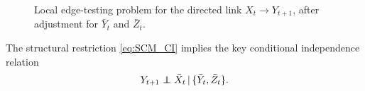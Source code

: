 \documentclass[12pt]{article}
\newcommand\independent{\protect\mathpalette{\protect\independenT}{\perp}}
\def\independenT#1#2{\mathrel{\rlap{$#1#2$}\mkern2mu{#1#2}}}
\newcommand\given{\,|\,}
\numberwithin{equation}{section}
\begin{document}
\begin{figure}[htbp]
\begin{tikzpicture}
    









    \end{tikzpicture}
    \caption{Local edge-testing problem for the directed link \(X_t\to Y_{t+1}\), after adjustment for $\bar Y_t$ and $\bar Z_t$.}
    \label{fig:causal_diagram}
\end{figure}
The structural restriction \eqref{eq:SCM_CI} implies the key conditional independence relation
\begin{equation}
\label{eq:CI_basic}
Y_{t+1}
\independent
\bar X_t
\given
\{\bar Y_t,\bar Z_t\}.
\end{equation}
\end{document}
